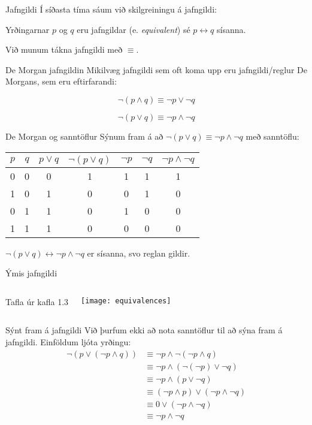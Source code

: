 \documentclass[handout]{beamer}
\begin{document}
\begin{frame}{Jafngildi}
Í síðasta tíma sáum við skilgreiningu á jafngildi:

\begin{tcolorbox}[title=Jafngildi]
Yrðingarnar $p$ og $q$ eru jafngildar (e. \emph{equivalent}) sé $p \leftrightarrow q$ sísanna.
\end{tcolorbox}

Við munum tákna jafngildi með $\equiv$.
\end{frame}

\begin{frame}{De Morgan jafngildin}
Mikilvæg jafngildi sem oft koma upp eru jafngildi/reglur De Morgans, sem eru eftirfarandi:

\[
 \lnot ( p \land q ) \equiv \lnot p \lor \lnot q
\]

\[
 \lnot (p \lor q ) \equiv \lnot p \land \lnot q
\]

\end{frame}

\begin{frame}{De Morgan og sanntöflur}
Sýnum fram á að $\lnot (p \lor q ) \equiv \lnot p \land \lnot q$ með sanntöflu:
\begin{center}
\begin{tabular}{ccccccc}
\toprule
$p$&$q$&$p \lor q$&$\lnot(p \lor q)$&$\lnot p$&$\lnot q$&$\lnot p \land \lnot q$\\
\midrule
0&0&0&1&1&1&1\\
1&0&1&0&0&1&0\\
0&1&1&0&1&0&0\\
1&1&1&0&0&0&0\\
\bottomrule
\end{tabular}
\end{center}
$\lnot (p \lor q ) \leftrightarrow \lnot p \land \lnot q$ er sísanna, svo reglan gildir.
\end{frame}

\begin{frame}{Ýmis jafngildi}
\begin{columns}
Tafla úr kafla 1.3
\begin{center}
\texttt{[image: equivalences]}
\end{center}
\end{columns}
\end{frame}

\begin{frame}{Sýnt fram á jafngildi}
Við þurfum ekki að nota sanntöflur til að sýna fram á jafngildi. Einföldum ljóta yrðingu:
\begin{align*}
\lnot (p \lor (\lnot p \land q)) &\equiv \lnot p \land \lnot ( \lnot p \land q)\\
&\equiv \lnot p \land (\lnot (\lnot p) \lor \lnot q)\\
&\equiv \lnot p \land (p \lor \lnot q)\\
&\equiv (\lnot p \land p ) \lor (\lnot p \land \lnot q)\\
&\equiv 0 \lor (\lnot p \land \lnot q)\\
&\equiv \lnot p \land \lnot q
\end{align*}
\end{frame}
\end{document}
